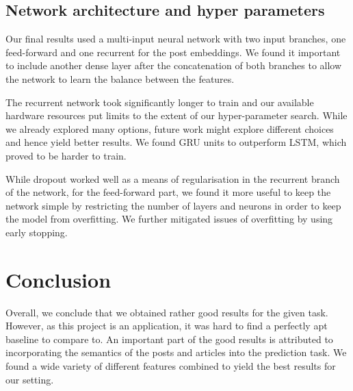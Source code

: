 \documentclass[acmsmall]{acmart}
\begin{document}
\subsection{Network architecture and hyper parameters}
Our final results used a multi-input neural network with two input branches, one feed-forward and one recurrent for the post embeddings. We found it important to include another dense layer after the concatenation of both branches to allow the network to learn the balance between the features.

The recurrent network took significantly longer to train and our available hardware resources put limits to the extent of our hyper-parameter search. While we already explored many options, future work might explore different choices and hence yield better results. We found GRU units to outperform LSTM, which proved to be harder to train. 

While dropout worked well as a means of regularisation in the recurrent branch of the network, for the feed-forward part, we found it more useful to keep the network simple by restricting the number of layers and neurons in order to keep the model from overfitting. We further mitigated issues of overfitting by using early stopping.

\section{Conclusion}

Overall, we conclude that we obtained rather good results for the given task. However, as this project is an application, it was hard to find a perfectly apt baseline to compare to. An important part of the good results is attributed to incorporating the semantics of the posts and articles into the prediction task. We found a wide variety of different features combined to yield the best results for our setting. 



\pagebreak



\end{document}
